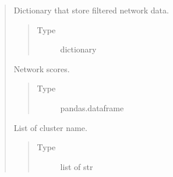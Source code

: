 \documentclass[letterpaper,10pt,english]{sphinxmanual}
\begin{document}
\begin{quote}
\begin{fulllineitems}
\begin{fulllineitems}
\begin{quote}
\begin{description}
\end{description}\end{quote}

\end{fulllineitems}


\begin{fulllineitems}
\label{\detokenize{modules/celloracle.network_analysis:celloracle.network_analysis.Links.filtered_links}}
Dictionary that store filtered network data.
\begin{quote}\begin{description}
\item[{Type}] \leavevmode
dictionary

\end{description}\end{quote}

\end{fulllineitems}


\begin{fulllineitems}
\label{\detokenize{modules/celloracle.network_analysis:celloracle.network_analysis.Links.merged_score}}
Network scores.
\begin{quote}\begin{description}
\item[{Type}] \leavevmode
pandas.dataframe

\end{description}\end{quote}

\end{fulllineitems}


\begin{fulllineitems}
\label{\detokenize{modules/celloracle.network_analysis:celloracle.network_analysis.Links.cluster}}
List of cluster name.
\begin{quote}\begin{description}
\item[{Type}] \leavevmode
list of str


\end{description}
\end{quote}
\end{fulllineitems}
\end{fulllineitems}
\end{quote}
\end{document}
